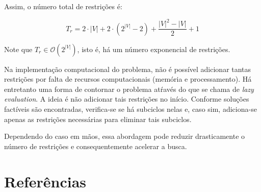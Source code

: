 \documentclass{article}
\newcommand{\abs}[1]{\ensuremath{\left| #1 \right|}}
\newcommand{\vertices}{\ensuremath{V}}
\newcommand{\nvertices}{\ensuremath{\abs{\vertices}}}
\newcommand{\totalconstraints}{\ensuremath{T_r}}
\newcommand{\bigo}[1]{\ensuremath{\mathcal{O}\left( #1 \right)}}
\begin{document}
Assim, o número total de restrições é:

\begin{equation}
	\totalconstraints =
		  2 \cdot \abs{\vertices}
		+ 2 \cdot \left( 2^{\abs{\vertices}} - 2\right)
		+ \dfrac{\abs{\vertices}^2 - \abs{\vertices}}{2}
		+ 1
\end{equation}

Note que $\totalconstraints \in \bigo{2^{\nvertices}}$, isto é, há um número exponencial de restrições.

Na implementação computacional do problema, não é possível adicionar tantas restrições por falta de recursos computacionais (memória e processamento). Há entretanto uma forma de contornar o problema atŕavés do que se chama de \textit{lazy evaluation}. A ideia é não adicionar tais restrições no início. Conforme soluções factíveis são encontradas, verifica-se se há subciclos nelas e, caso sim, adiciona-se apenas as restrições necessárias para eliminar tais subciclos.

Dependendo do caso em mãos, essa abordagem pode reduzir drasticamente o número de restrições e consequentemente acelerar a busca.

\section{Referências}



\end{document}
